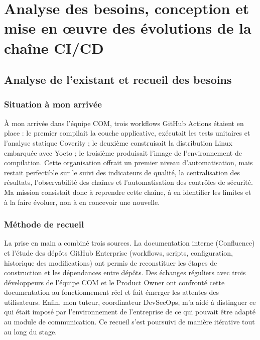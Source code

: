 \chapter{Analyse des besoins, conception et mise en œuvre des évolutions de la chaîne CI/CD}
\label{chap:besoins}

\section{Analyse de l'existant et recueil des besoins}
\label{sec:bes-analyse}

\subsection{Situation à mon arrivée}

À mon arrivée dans l'équipe COM, trois workflows GitHub Actions étaient en
place : le premier compilait la couche applicative, exécutait les tests
unitaires et l'analyse statique Coverity ; le deuxième construisait la
distribution Linux embarquée avec Yocto ; le troisième produisait l'image de
l'environnement de compilation. Cette organisation offrait un premier niveau
d'automatisation, mais restait perfectible sur le suivi des indicateurs de
qualité, la centralisation des résultats, l'observabilité des chaînes et
l'automatisation des contrôles de sécurité. Ma mission consistait donc à
reprendre cette chaîne, à en identifier les limites et à la faire évoluer,
non à en concevoir une nouvelle.

\subsection{Méthode de recueil}

La prise en main a combiné trois sources. La documentation interne
(Confluence) et l'étude des dépôts GitHub Enterprise (workflows, scripts,
configuration, historique des modifications) ont permis de reconstituer les
étapes de construction et les dépendances entre dépôts. Des échanges réguliers
avec trois développeurs de l'équipe COM et le Product Owner ont confronté cette
documentation au fonctionnement réel et fait émerger les attentes des
utilisateurs. Enfin, mon tuteur, coordinateur DevSecOps, m'a aidé à distinguer
ce qui était imposé par l'environnement de l'entreprise de ce qui pouvait être
adapté au module de communication. Ce recueil s'est poursuivi de manière
itérative tout au long du stage.

